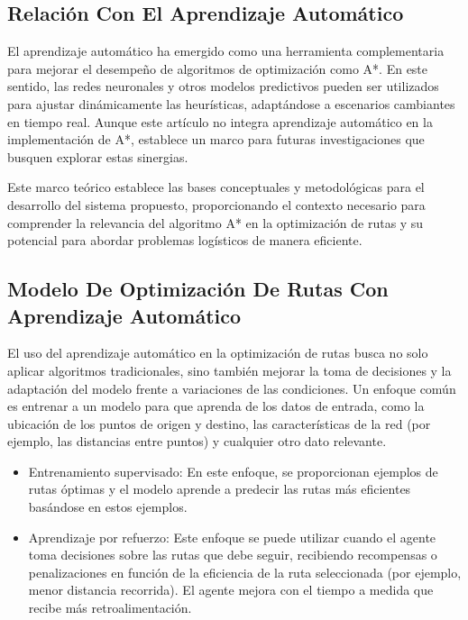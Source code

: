\documentclass[conference]{IEEEtran}
\begin{document}
	\subsection{Relación Con El Aprendizaje Automático}
	El aprendizaje automático ha emergido como una herramienta complementaria para mejorar el desempeño de algoritmos de optimización como A*. En este sentido, las redes neuronales y otros modelos predictivos pueden ser utilizados para ajustar dinámicamente las heurísticas, adaptándose a escenarios cambiantes en tiempo real. Aunque este artículo no integra aprendizaje automático en la implementación de A*, establece un marco para futuras investigaciones que busquen explorar estas sinergias.
	
	Este marco teórico establece las bases conceptuales y metodológicas para el desarrollo del sistema propuesto, proporcionando el contexto necesario para comprender la relevancia del algoritmo A* en la optimización de rutas y su potencial para abordar problemas logísticos de manera eficiente.
	\subsection{Modelo De Optimización De Rutas Con Aprendizaje Automático}
	El uso del aprendizaje automático en la optimización de rutas busca no solo aplicar algoritmos tradicionales, sino también mejorar la toma de decisiones y la adaptación del modelo frente a variaciones de las condiciones. Un enfoque común es entrenar a un modelo para que aprenda de los datos de entrada, como la ubicación de los puntos de origen y destino, las características de la red (por ejemplo, las distancias entre puntos) y cualquier otro dato relevante.
	\begin{itemize}
		\item Entrenamiento supervisado: En este enfoque, se proporcionan ejemplos de rutas óptimas y el modelo aprende a predecir las rutas más eficientes basándose en estos ejemplos.
		\item Aprendizaje por refuerzo: Este enfoque se puede utilizar cuando el agente toma decisiones sobre las rutas que debe seguir, recibiendo recompensas o penalizaciones en función de la eficiencia de la ruta seleccionada (por ejemplo, menor distancia recorrida). El agente mejora con el tiempo a medida que recibe más retroalimentación.
	\end{itemize}
	
\end{document}

